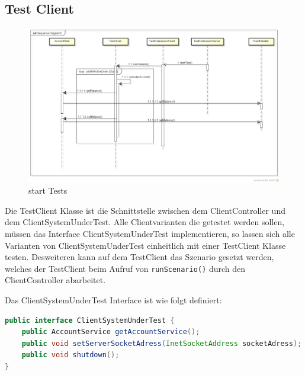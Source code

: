 \subsection{Test Client}
\label{sec:testclient}

\begin{figure}[H]
\begin{center}
\includegraphics[scale=0.3]{image_testFramework/startTest.png}
\end{center}
\caption{start Tests}
\end{figure}

Die TestClient Klasse ist die Schnittstelle zwischen dem ClientController und dem ClientSystemUnderTest. Alle Clientvarianten die getestet werden sollen, müssen das Interface ClientSystemUnderTest implementieren, so lassen sich alle Varianten von ClientSystemUnderTest einheitlich mit einer TestClient Klasse testen. Desweiteren kann auf dem TestClient das Szenario gesetzt werden, welches der TestClient beim Aufruf von \verb+runScenario()+ durch den ClientController abarbeitet.

Das ClientSystemUnderTest Interface ist wie folgt definiert:
\begin{lstlisting}[language=java, breaklines=true] 	
public interface ClientSystemUnderTest {	
	public AccountService getAccountService();
	public void setServerSocketAdress(InetSocketAddress socketAdress);
	public void shutdown();
}	
\end{lstlisting}

